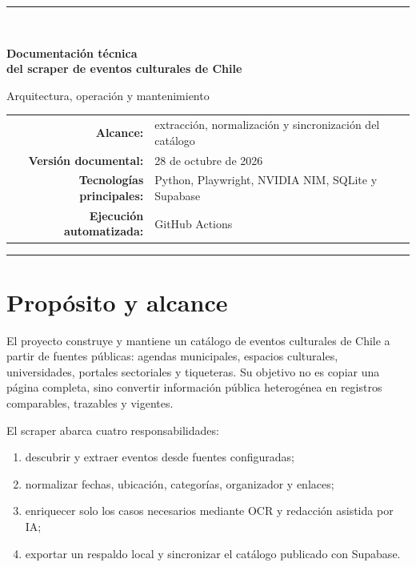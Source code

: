 \documentclass[11pt,a4paper]{article}
\begin{document}
\hypersetup{pageanchor=false}
\begin{titlepage}
\centering
\vspace*{2cm}
{\color{azul}\rule{\textwidth}{1.4pt}}\\[1.3cm]
{\Huge\bfseries Documentaci\'{o}n t\'{e}cnica\\[0.25cm]
del scraper de eventos culturales de Chile\par}
\vspace{0.8cm}
{\Large Arquitectura, operaci\'{o}n y mantenimiento\par}
\vfill
\begin{tabular}{rl}
\textbf{Alcance:} & extracci\'{o}n, normalizaci\'{o}n y sincronizaci\'{o}n del cat\'{a}logo \\
\textbf{Versi\'{o}n documental:} & 28 de octubre de 2026 \\
\textbf{Tecnolog\'{i}as principales:} & Python, Playwright, NVIDIA NIM, SQLite y Supabase \\
\textbf{Ejecuci\'{o}n automatizada:} & GitHub Actions \\
\end{tabular}
\vfill
{\color{azul}\rule{\textwidth}{1.4pt}}
\end{titlepage}
\hypersetup{pageanchor=true}

\tableofcontents
\newpage

\section{Prop\'{o}sito y alcance}

El proyecto construye y mantiene un cat\'{a}logo de eventos culturales de Chile a partir de fuentes p\'{u}blicas: agendas municipales, espacios culturales, universidades, portales sectoriales y tiqueteras. Su objetivo no es copiar una p\'{a}gina completa, sino convertir informaci\'{o}n p\'{u}blica heterog\'{e}nea en registros comparables, trazables y vigentes.

El scraper abarca cuatro responsabilidades:
\begin{enumerate}
  \item descubrir y extraer eventos desde fuentes configuradas;
  \item normalizar fechas, ubicaci\'{o}n, categor\'{i}as, organizador y enlaces;
  \item enriquecer solo los casos necesarios mediante OCR y redacci\'{o}n asistida por IA;
  \item exportar un respaldo local y sincronizar el cat\'{a}logo publicado con Supabase.
\end{enumerate}
\end{document}

